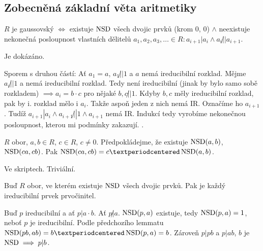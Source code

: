 \documentclass[12pt]{article}                   %
\begin{document}
    \subsection{Zobecněná základní věta aritmetiky}
        \begin{veta}
            $R$ je gaussovský $\Leftrightarrow$ existuje $\operatorname{NSD}$ všech dvojic prvků (krom 0, 0) $\land$ neexistuje nekonečná posloupnost vlastních dělitelů $a_1, a_2, a_3, … \in R: a_{i+1}|a_i \land a_i \not||a_{i+1}$.

            \begin{dukazin}[$\implies$]
                Je dokázáno.
            \end{dukazin}

            \begin{dukazin}
                Sporem s druhou částí: Ať $a_1 = a$, $a_1 \not||1$ a $a$ nemá ireducibilní rozklad. Mějme $a_i \not|| 1$ a nemá ireducibilní rozklad. Tedy není ireducibilní (jinak by bylo samo sobě rozkladem) $\implies a_i = b·c$ pro nějaké $b, c \not||1$. Kdyby $b, c$ měly ireducibilní rozklad, pak by i. rozklad mělo i $a_i$. Takže aspoň jeden z nich nemá IR. Označíme ho $a_{i+1}$. Tudíž $a_{i+1}|a_i \land a_{i+1}\not||1 \land a_{i+1}$ nemá IR. Indukcí tedy vyrobíme nekonečnou posloupnost, kterou mi podmínky zakazují. \lightning.
            \end{dukazin}

            \begin{lemmain}
                $R$ obor, $a, b \in R$, $c \in R$, $c ≠ 0$. Předpokládejme, že existuje $\operatorname{NSD}(a, b)$, $\operatorname{NSD}(ca, cb)$. Pak $\NSD(ca, cb) = c·\NSD(a, b)$.

                \begin{dukazin}
                    Ve skriptech. Triviální.
                \end{dukazin}
            \end{lemmain}

            \begin{lemmain}
                Buď $R$ obor, ve kterém existuje $\operatorname{NSD}$ všech dvojic prvků. Pak je každý ireducibilní prvek prvočinitel.

                \begin{dukazin}
                    Buď $p$ ireducibilní a ať $p|a·b$. Ať $p \not| a$. $\operatorname{NSD}(p, a)$ existuje, tedy $\operatorname{NSD}(p, a) = 1$, neboť $p$ je ireducibilní. Podle předchozího lemmatu $\NSD(pb, ab) = b·\NSD(p, a) = b$. Zároveň $p | pb$ a $p|ab$, $b$ je $\operatorname{NSD} \implies p|b$.
                \end{dukazin}
            \end{lemmain}


\end{veta}
\end{document}
